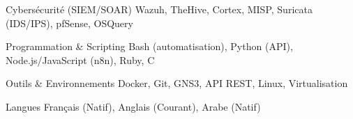 
\begin{cvskills}

    \cvskill
    {Cybersécurité (SIEM/SOAR)} %
    {Wazuh, TheHive, Cortex, MISP, Suricata (IDS/IPS), pfSense, OSQuery} %

    \cvskill
    {Programmation \& Scripting} %
    {Bash (automatisation), Python (API), Node.js/JavaScript (n8n), Ruby, C} %

    \cvskill
    {Outils \& Environnements} %
    {Docker, Git, GNS3, API REST, Linux, Virtualisation} %

    \cvskill
    {Langues} %
    {Français (Natif), Anglais (Courant), Arabe (Natif)} %

\end{cvskills}
